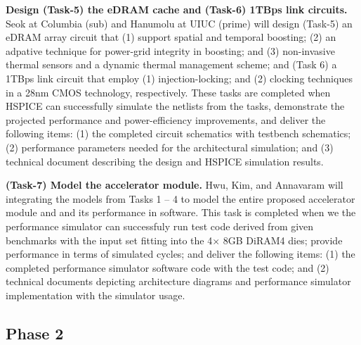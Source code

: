 \noindent
\textbf{Design (Task-5) the eDRAM cache and (Task-6) 1TBps link circuits.}
Seok at Columbia (sub) and Hanumolu at UIUC (prime) will design 
(Task-5) an eDRAM array circuit that (1) support spatial and temporal boosting; (2) an adpative technique for power-grid integrity in boosting; and (3) non-invasive thermal sensors and a dynamic thermal management scheme; and 
(Task 6) a 1TBps link circuit that employ (1) injection-locking; and (2) clocking techniques in a 28nm CMOS technology, respectively.
These tasks are completed when HSPICE can successfully simulate the netlists from the tasks, demonstrate the projected performance and power-efficiency improvements, and deliver the following items:
(1) the completed circuit schematics with testbench schematics; (2) performance parameters needed for the architectural simulation; and (3) technical document describing the design and HSPICE simulation results.


\noindent
\textbf{(Task-7) Model the accelerator module.}
Hwu, Kim, and Annavaram will integrating the models from Tasks 1 -- 4 to model the entire proposed accelerator module and and its performance in software. 
This task is completed when we the performance simulator can successfuly run test code derived from given benchmarks with the input set fitting into the 4$\times$ 8GB DiRAM4 dies; provide performance in terms of simulated cycles; and deliver the following items:
(1) the completed performance simulator software code with the test code; and (2) technical documents depicting architecture diagrams and performance simulator implementation with the simulator usage.


\noindent
\subsection{Phase 2}
%

